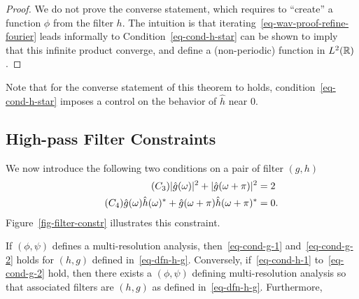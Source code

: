 \begin{proof}
We do not prove the converse statement, which requires to ``create'' a function $\phi$ from the filter $h$. The intuition is that iterating~\eqref{eq-wav-proof-refine-fourier} leads informally to
Condition~\eqref{eq-cond-h-star} can be shown to imply that this infinite product converge, and define a (non-periodic) function in $L^2(\mathbb{R})$.
\end{proof}


Note that for the converse statement of this theorem to holds, condition~\eqref{eq-cond-h-star} imposes a control on the behavior of $\hat h$ near 0. 

\subsection{High-pass Filter Constraints}

We now introduce the following two conditions on a pair of filter $(g,h)$
\begin{align}
	\label{eq-cond-g-1}\tag{$C_3$}  |\hat g(\omega)|^2 + |\hat g(\omega+\pi)|^2&=2  \\
	\label{eq-cond-g-2}\tag{$C_4$}   \hat g(\omega) \hat h(\omega)^* + \hat g(\omega+\pi) \hat h(\omega+\pi)^*&=0.
\end{align}
Figure~\ref{fig-filter-constr} illustrates this constraint. 




\begin{thm}\label{thm-wave-h}
	If $(\phi,\psi)$ defines a multi-resolution analysis, then~\eqref{eq-cond-g-1} and~\eqref{eq-cond-g-2} holds for $(h,g)$ defined in~\eqref{eq-dfn-h-g}.
	Conversely, if~\eqref{eq-cond-h-1} to~\eqref{eq-cond-g-2} hold, then there exists a $(\phi,\psi)$ defining multi-resolution analysis so that associated filters are $(h,g)$ as defined in~\eqref{eq-dfn-h-g}. Furthermore, 
\end{thm}

